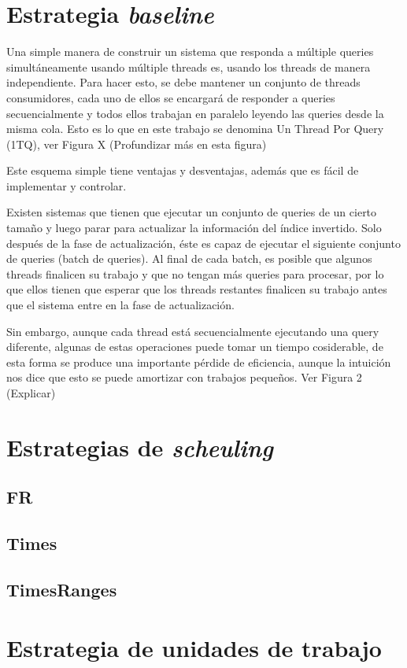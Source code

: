 \section{Estrategia \textit{baseline}}
\label{scheduling:baseline}
Una simple manera de construir un sistema que responda a múltiple queries simultáneamente usando múltiple threads es, usando los threads de manera independiente. Para hacer esto, se debe mantener un conjunto de threads consumidores, cada uno de ellos se encargará de responder a queries secuencialmente y todos ellos trabajan en paralelo leyendo las queries desde la misma cola. Esto es lo que en este trabajo se denomina Un Thread Por Query (1TQ), ver Figura X (Profundizar más en esta figura)

Este esquema simple tiene ventajas y desventajas, además que es fácil de implementar y controlar. 

Existen sistemas que tienen que ejecutar un conjunto de queries de un cierto tamaño y luego parar para actualizar la información del índice invertido. Solo después de la fase de actualización, éste es capaz de ejecutar el siguiente conjunto de queries (batch de queries). Al final de cada batch, es posible que algunos threads finalicen su trabajo y que no tengan más queries para procesar, por lo que ellos tienen que esperar que los threads restantes finalicen su trabajo antes que el sistema entre en la fase de actualización. 

Sin embargo, aunque cada thread está secuencialmente ejecutando una query diferente, algunas de estas operaciones puede tomar un tiempo cosiderable, de esta forma se produce una importante pérdide de eficiencia, aunque la intuición nos dice que esto se puede amortizar con trabajos pequeños. Ver Figura 2 (Explicar)




\section{Estrategias de \textit{scheuling}}
\label{scheduling:es}

\subsection{FR}
\label{scheduling:fr}

\subsection{Times}
\label{scheduling:times}

\subsection{TimesRanges}
\label{scheduling:timesranges}




\section{Estrategia de unidades de trabajo}
\label{scheduling:unidadestrabajo}

